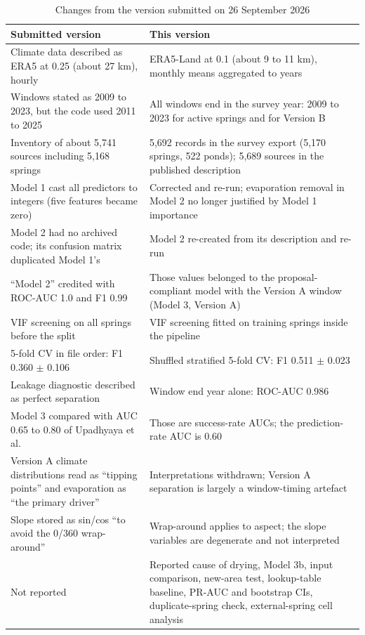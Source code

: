 \documentclass[12pt,a4paper]{article}
\begin{document}
\begin{table}[htbp]
\centering
\small
\caption{Changes from the version submitted on 26 September 2026}
\label{tab:corrections}
\begin{tabularx}{\linewidth}{LL}
\toprule
\textbf{Submitted version} & \textbf{This version} \\
\midrule
Climate data described as ERA5 at 0.25\textdegree{} (about 27 km), hourly & ERA5-Land at 0.1\textdegree{} (about 9 to 11 km), monthly means aggregated to years \\
Windows stated as 2009 to 2023, but the code used 2011 to 2025 & All windows end in the survey year: 2009 to 2023 for active springs and for Version B \\
Inventory of about 5,741 sources including 5,168 springs & 5,692 records in the survey export (5,170 springs, 522 ponds); 5,689 sources in the published description \\
Model 1 cast all predictors to integers (five features became zero) & Corrected and re-run; evaporation removal in Model 2 no longer justified by Model 1 importance \\
Model 2 had no archived code; its confusion matrix duplicated Model 1's & Model 2 re-created from its description and re-run \\
``Model 2'' credited with ROC-AUC 1.0 and F1 0.99 & Those values belonged to the proposal-compliant model with the Version A window (Model 3, Version A) \\
VIF screening on all springs before the split & VIF screening fitted on training springs inside the pipeline \\
5-fold CV in file order: F1 0.360 $\pm$ 0.106 & Shuffled stratified 5-fold CV: F1 0.511 $\pm$ 0.023 \\
Leakage diagnostic described as perfect separation & Window end year alone: ROC-AUC 0.986 \\
Model 3 compared with AUC 0.65 to 0.80 of Upadhyaya et al. & Those are success-rate AUCs; the prediction-rate AUC is 0.60 \\
Version A climate distributions read as ``tipping points'' and evaporation as ``the primary driver'' & Interpretations withdrawn; Version A separation is largely a window-timing artefact \\
Slope stored as sin/cos ``to avoid the 0\textdegree{}/360\textdegree{} wrap-around'' & Wrap-around applies to aspect; the slope variables are degenerate and not interpreted \\
Not reported & Reported cause of drying, Model 3b, input comparison, new-area test, lookup-table baseline, PR-AUC and bootstrap CIs, duplicate-spring check, external-spring cell analysis \\
\bottomrule
\end{tabularx}
\end{table}
\end{document}
